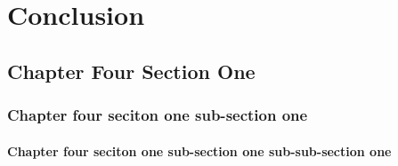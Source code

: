 \chapter{Conclusion}
\section{Chapter Four Section One}
\subsection{Chapter four seciton one sub-section one}
\subsubsection{Chapter four seciton one sub-section one sub-sub-section one}

